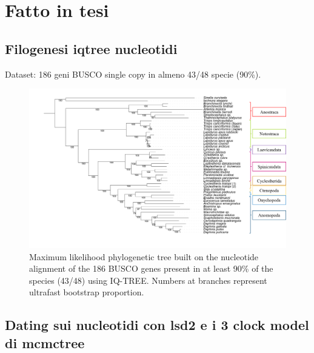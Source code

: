 \section{Fatto in tesi}
\subsection{Filogenesi iqtree nucleotidi}
Dataset: 186 geni BUSCO single copy in almeno 43/48 specie (90\%).

\begin{figure}[ht]
    \centering
    \includegraphics[width=1\textwidth]{Figures/busco_tree_fna.png}
    \caption[BUSCO phylogeny]{Maximum likelihood phylogenetic tree built on the nucleotide alignment of the 186 BUSCO genes present in at least 90\% of the species (43/48) using IQ-TREE. Numbers at branches represent ultrafast bootstrap proportion.
}
    \label{fig:busco_phylo}
\end{figure}

\newpage
\subsection{Dating sui nucleotidi con lsd2 e i 3 clock model di mcmctree}

